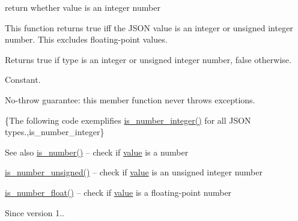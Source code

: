 return whether value is an integer number 

This function returns true iff the J\+S\+ON value is an integer or unsigned integer number. This excludes floating-\/point values.

\begin{DoxyReturn}{Returns}
{\ttfamily true} if type is an integer or unsigned integer number, {\ttfamily false} otherwise.
\end{DoxyReturn}
Constant.

No-\/throw guarantee\+: this member function never throws exceptions.

\{The following code exemplifies {\ttfamily \hyperlink{classnlohmann_1_1basic__json_a435c93d06ef28f8003c31f62ffe4aed1}{is\+\_\+number\+\_\+integer()}} for all J\+S\+ON types.,is\+\_\+number\+\_\+integer\}

\begin{DoxySeeAlso}{See also}
\hyperlink{classnlohmann_1_1basic__json_a957eb9594c7f0ca93212c30f3a400873}{is\+\_\+number()} -- check if \hyperlink{classnlohmann_1_1basic__json_a407e73a037e6e3067ef7aa2c25a79f39}{value} is a number 

\hyperlink{classnlohmann_1_1basic__json_aa388dc101bc285a98122a38fd2e3a9db}{is\+\_\+number\+\_\+unsigned()} -- check if \hyperlink{classnlohmann_1_1basic__json_a407e73a037e6e3067ef7aa2c25a79f39}{value} is an unsigned integer number 

\hyperlink{classnlohmann_1_1basic__json_a7641371be8a347f3c1e05ac089a74c36}{is\+\_\+number\+\_\+float()} -- check if \hyperlink{classnlohmann_1_1basic__json_a407e73a037e6e3067ef7aa2c25a79f39}{value} is a floating-\/point number
\end{DoxySeeAlso}
\begin{DoxySince}{Since}
version 1.. 
\end{DoxySince}
\hypertarget{classnlohmann_1_1basic__json_aa388dc101bc285a98122a38fd2e3a9db}{}\label{classnlohmann_1_1basic__json_aa388dc101bc285a98122a38fd2e3a9db} 
